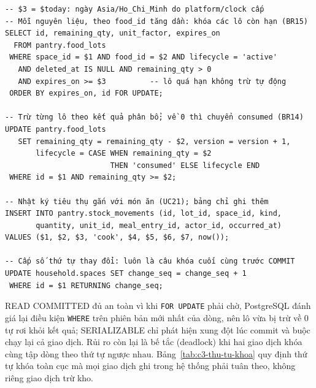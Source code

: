 \begin{Verbatim}
-- $3 = $today: ngày Asia/Ho_Chi_Minh do platform/clock cấp
-- Mỗi nguyên liệu, theo food_id tăng dần: khóa các lô còn hạn (BR15)
SELECT id, remaining_qty, unit_factor, expires_on
  FROM pantry.food_lots
 WHERE space_id = $1 AND food_id = $2 AND lifecycle = 'active'
   AND deleted_at IS NULL AND remaining_qty > 0
   AND expires_on >= $3          -- lô quá hạn không trừ tự động
 ORDER BY expires_on, id FOR UPDATE;

-- Trừ từng lô theo kết quả phân bổ; về 0 thì chuyển consumed (BR14)
UPDATE pantry.food_lots
   SET remaining_qty = remaining_qty - $2, version = version + 1,
       lifecycle = CASE WHEN remaining_qty = $2
                        THEN 'consumed' ELSE lifecycle END
 WHERE id = $1 AND remaining_qty >= $2;

-- Nhật ký tiêu thụ gắn với món ăn (UC21); bảng chỉ ghi thêm
INSERT INTO pantry.stock_movements (id, lot_id, space_id, kind,
       quantity, unit_id, meal_entry_id, actor_id, occurred_at)
VALUES ($1, $2, $3, 'cook', $4, $5, $6, $7, now());

-- Cấp số thứ tự thay đổi: luôn là câu khóa cuối cùng trước COMMIT
UPDATE household.spaces SET change_seq = change_seq + 1
 WHERE id = $1 RETURNING change_seq;
\end{Verbatim}

READ COMMITTED đủ an toàn vì khi \texttt{FOR UPDATE} phải chờ, PostgreSQL đánh giá lại điều kiện \texttt{WHERE} trên phiên bản mới nhất của dòng, nên lô vừa bị trừ về 0 tự rơi khỏi kết quả; SERIALIZABLE chỉ phát hiện xung đột lúc commit và buộc chạy lại cả giao dịch. Rủi ro còn lại là bế tắc (deadlock) khi hai giao dịch khóa cùng tập dòng theo thứ tự ngược nhau. Bảng~\ref{tab:c3-thu-tu-khoa} quy định thứ tự khóa toàn cục mà mọi giao dịch ghi trong hệ thống phải tuân theo, không riêng giao dịch trừ kho.

